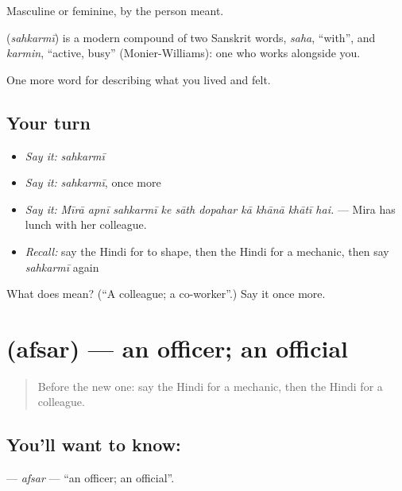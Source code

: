 Masculine or feminine, by the person meant.

\begin{cousinweb}
\textbf{} (\emph{sahkarmī}) is a modern compound of two Sanskrit words, \emph{saha}, \textquotedblleft{}with\textquotedblright{}, and \emph{karmin}, \textquotedblleft{}active, busy\textquotedblright{} (Monier-Williams): one who works alongside you.
\end{cousinweb}

\begin{grammarlens}[title={What you've built}]
One more word for describing what you lived and felt.
\end{grammarlens}

\subsection*{Your turn}
\begin{itemize}
\raggedright
  \item \emph{Say it:} \emph{sahkarmī}
  \item \emph{Say it:} \emph{sahkarmī}, once more
  \item \emph{Say it:} \emph{Mīrā apnī sahkarmī ke sāth dopahar kā khānā khātī hai.} — Mira has lunch with her colleague.
  \item \emph{Recall:} say the Hindi for to shape, then the Hindi for a mechanic, then say \emph{sahkarmī} again
\end{itemize}

\begin{tcolorbox}[breakable,colback=teal!4,colframe=teal!35!black,title={Before you move on}]
What does  mean? (\textquotedblleft{}A colleague; a co-worker\textquotedblright{}.) Say it once more.
\end{tcolorbox}
\section[\texorpdfstring{\hi{अफ़सर} (afsar)}{अफ़सर (afsar)}]{ (afsar) — an officer; an official}

\label{lesson:HI-C507-afsar}



\begin{quote}
Before the new one: say the Hindi for a mechanic, then the Hindi for a colleague.
\end{quote}

\subsection*{You'll want to know: }
\textbf{} — \emph{afsar} — \textquotedblleft{}an officer; an official\textquotedblright{}.

